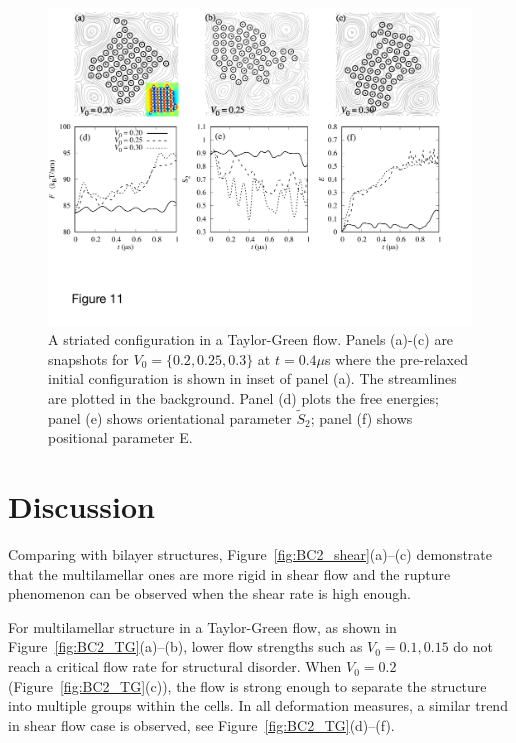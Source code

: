 \documentclass[prb,preprint,showpacs,preprintnumbers,amsmath,amssymb,longbibliography]{revtex4-1}
\begin{document}
\begin{figure}
  \begin{center}
\includegraphics[width=1.0\textwidth]{Figures/Figure11.pdf}            
  \end{center}
  \vspace{-20pt}  
  \caption{\label{fig:BC3_TG} A striated configuration in a Taylor-Green flow. Panels (a)-(c) are snapshots for $V_0=\{0.2, 0.25, 0.3\}$ at $t=0.4\mu$s where the pre-relaxed initial configuration is shown in inset of panel (a). The streamlines are plotted in the background.
Panel (d) plots the free energies; panel (e) shows orientational parameter $\tilde{S}_2$; panel (f) shows positional parameter E.
}
\end{figure}





\section{Discussion}

Comparing with bilayer structures, Figure~\ref{fig:BC2_shear}(a)--(c) demonstrate that the multilamellar ones are more rigid in shear flow and the rupture phenomenon can be observed 
when the shear rate is high enough.

For multilamellar structure in a Taylor-Green flow, as shown in Figure~\ref{fig:BC2_TG}(a)--(b), lower flow strengths such as $V_0=0.1,0.15$ do not reach a critical flow rate for structural disorder. 
When $V_0=0.2$ (Figure~\ref{fig:BC2_TG}(c)), the flow is strong enough to separate the structure
into multiple groups within the cells. In all deformation measures, a similar trend in shear flow case is observed, see Figure~\ref{fig:BC2_TG}(d)--(f). 
\end{document}
